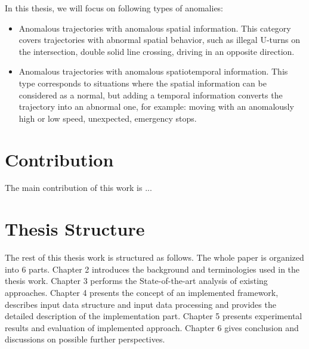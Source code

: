 In this thesis, we will focus on following types of anomalies:
\begin{itemize}
	\item Anomalous trajectories with anomalous spatial information. This category covers trajectories with abnormal spatial behavior, such as illegal U-turns on the intersection, double solid line crossing, driving in an opposite direction.
	\item Anomalous trajectories with anomalous spatiotemporal information. This type corresponds to situations where the spatial information can be considered as a normal, but adding a temporal information converts the trajectory into an abnormal one, for example: moving with an anomalously high or low speed, unexpected, emergency stops.
\end{itemize}

\section{Contribution}

The main contribution of this work is ...

\section{Thesis Structure}

The rest of this thesis work is structured as follows. The whole paper is organized into 6 parts. Chapter 2 introduces the background and terminologies used in the thesis work. Chapter 3 performs the State-of-the-art analysis of existing approaches. Chapter 4 presents the concept of an implemented framework, describes input data structure and input data processing and provides the detailed description of the implementation part. Chapter 5 presents experimental results and evaluation of implemented approach. Chapter 6 gives conclusion and discussions on possible further perspectives.